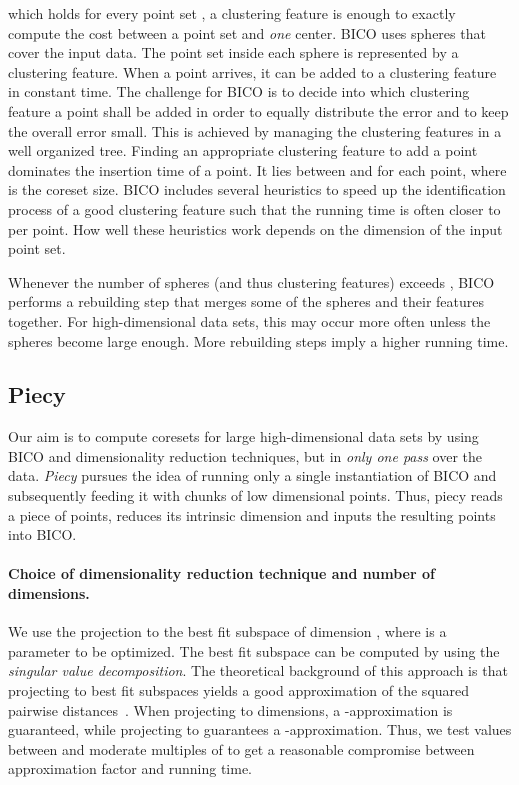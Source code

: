 \documentclass[a4paper]{scrartcl}
\begin{document}
which holds for every point set , a clustering feature is enough to exactly compute the cost between a point set and \emph{one} center.
BICO uses spheres that cover the input data. The point set inside each sphere is represented by a clustering feature. When a point arrives, it can be added to a clustering feature in constant time. The challenge for BICO is to decide into which clustering feature a point shall be added in order to equally distribute the error and to keep the overall error small. This is achieved by managing the clustering features in a well organized tree. Finding an appropriate clustering feature to add a point dominates the insertion time of a point. It lies between  and  for each point, where  is the coreset size. BICO includes several heuristics to speed up the identification process of a good clustering feature such that the running time is often closer to  per point. How well these heuristics work depends on the dimension of the input point set.

Whenever the number of spheres (and thus clustering features) exceeds , BICO performs a rebuilding step that merges some of the spheres and their features together. For high-dimensional data sets, this may occur more often unless the spheres become large enough. More rebuilding steps imply a higher running time.

\subsection{Piecy}

Our aim is to compute coresets for large high-dimensional data sets by using BICO and dimensionality reduction techniques, but in \emph{only one pass} over the data.
\emph{Piecy} pursues the idea of running only a single instantiation of BICO and subsequently feeding it with chunks of low dimensional points. Thus, piecy reads a piece of  points, reduces its intrinsic dimension and inputs the resulting points into BICO.

\paragraph*{Choice of dimensionality reduction technique and number of dimensions.}
We use the projection to the best fit subspace of dimension , where  is a parameter to be optimized.
The best fit subspace can be computed by using the \emph{singular value decomposition}.
The theoretical background of this approach is that projecting to best fit subspaces yields a good approximation of the squared pairwise distances~\cite{CEMMP15,DFKVV04}. When projecting to  dimensions, a -approximation is guaranteed, while projecting to  guarantees a -approximation. Thus, we test values between  and moderate multiples of  to get a reasonable compromise between approximation factor and running time.
\end{document}
